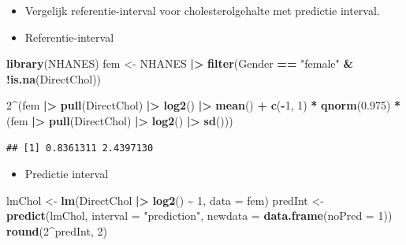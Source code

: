 \documentclass[
  12pt,dutch]{book}
\newenvironment{Shaded}{\begin{snugshade}}{\end{snugshade}}
\newcommand{\AttributeTok}[1]{\textcolor[rgb]{0.13,0.29,0.53}{#1}}
\newcommand{\DecValTok}[1]{\textcolor[rgb]{0.00,0.00,0.81}{#1}}
\newcommand{\FloatTok}[1]{\textcolor[rgb]{0.00,0.00,0.81}{#1}}
\newcommand{\FunctionTok}[1]{\textcolor[rgb]{0.13,0.29,0.53}{\textbf{#1}}}
\newcommand{\NormalTok}[1]{#1}
\newcommand{\OtherTok}[1]{\textcolor[rgb]{0.56,0.35,0.01}{#1}}
\newcommand{\SpecialCharTok}[1]{\textcolor[rgb]{0.81,0.36,0.00}{\textbf{#1}}}
\newcommand{\StringTok}[1]{\textcolor[rgb]{0.31,0.60,0.02}{#1}}
\providecommand{\tightlist}{%
  \setlength{\itemsep}{0pt}\setlength{\parskip}{0pt}}
\theoremstyle{definition}
\theoremstyle{definition}
\theoremstyle{definition}
\theoremstyle{definition}
\theoremstyle{remark}
\begin{document}
\begin{itemize}
\item
  Vergelijk referentie-interval voor cholesterolgehalte met predictie interval.
\item
  Referentie-interval
\end{itemize}

\begin{Shaded}
\begin{Highlighting}[]
\FunctionTok{library}\NormalTok{(NHANES)}
\NormalTok{fem }\OtherTok{\textless{}{-}}\NormalTok{ NHANES }\SpecialCharTok{|\textgreater{}}
    \FunctionTok{filter}\NormalTok{(Gender }\SpecialCharTok{==} \StringTok{"female"} \SpecialCharTok{\&} \SpecialCharTok{!}\FunctionTok{is.na}\NormalTok{(DirectChol))}

\DecValTok{2}\SpecialCharTok{\^{}}\NormalTok{(fem }\SpecialCharTok{|\textgreater{}}
    \FunctionTok{pull}\NormalTok{(DirectChol) }\SpecialCharTok{|\textgreater{}}
    \FunctionTok{log2}\NormalTok{() }\SpecialCharTok{|\textgreater{}}
    \FunctionTok{mean}\NormalTok{() }\SpecialCharTok{+} \FunctionTok{c}\NormalTok{(}\SpecialCharTok{{-}}\DecValTok{1}\NormalTok{, }\DecValTok{1}\NormalTok{) }\SpecialCharTok{*} \FunctionTok{qnorm}\NormalTok{(}\FloatTok{0.975}\NormalTok{) }\SpecialCharTok{*}\NormalTok{ (fem }\SpecialCharTok{|\textgreater{}}
    \FunctionTok{pull}\NormalTok{(DirectChol) }\SpecialCharTok{|\textgreater{}}
    \FunctionTok{log2}\NormalTok{() }\SpecialCharTok{|\textgreater{}}
    \FunctionTok{sd}\NormalTok{()))}
\end{Highlighting}
\end{Shaded}

\begin{verbatim}
## [1] 0.8361311 2.4397130
\end{verbatim}

\begin{itemize}
\tightlist
\item
  Predictie interval
\end{itemize}

\begin{Shaded}
\begin{Highlighting}[]
\NormalTok{lmChol }\OtherTok{\textless{}{-}} \FunctionTok{lm}\NormalTok{(DirectChol }\SpecialCharTok{|\textgreater{}}
    \FunctionTok{log2}\NormalTok{() }\SpecialCharTok{\textasciitilde{}} \DecValTok{1}\NormalTok{, }\AttributeTok{data =}\NormalTok{ fem)}
\NormalTok{predInt }\OtherTok{\textless{}{-}} \FunctionTok{predict}\NormalTok{(lmChol, }\AttributeTok{interval =} \StringTok{"prediction"}\NormalTok{,}
    \AttributeTok{newdata =} \FunctionTok{data.frame}\NormalTok{(}\AttributeTok{noPred =} \DecValTok{1}\NormalTok{))}
\FunctionTok{round}\NormalTok{(}\DecValTok{2}\SpecialCharTok{\^{}}\NormalTok{predInt, }\DecValTok{2}\NormalTok{)}
\end{Highlighting}
\end{Shaded}
\end{document}
